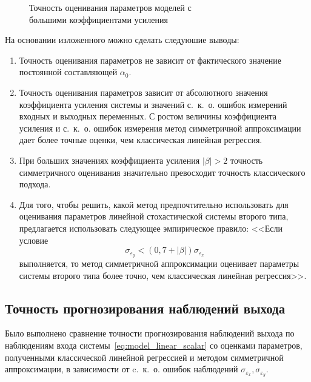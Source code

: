 \begin{figure}[p]
  \vspace{\baselineskip}
  \caption{%
    Точность оценивания параметров моделей с \\
    большими коэффициентами усиления
  }\label{fig:comparison_linear_params_beta-big}
\end{figure}

На основании изложенного можно сделать следуюшие выводы:
\begin{enumerate}
\item Точность оценивания параметров не зависит от фактического значение постоянной
  составляющей \( \alpha_0 \).
\item Точность оценивания параметров зависит от абсолютного значения коэффициента усиления системы и
  значений с.~к.~о. ошибок измерений входных и выходных переменных.
  С ростом величины коэффициента усиления и с.~к.~о. ошибок измерения
  метод симметричной аппроксимации дает более точные оценки,
  чем классическая линейная регрессия.
\item При больших значениях коэффициента усиления \( |\beta| > 2 \)
  точность симметричного оценивания значительно превосходит
  точность классического подхода.
\item Для того, чтобы решить, какой метод предпочтительно использовать для оценивания параметров
  линейной стохастической системы второго типа,
  предлагается использовать следующее эмпирическое правило:
  <<Если условие
  \begin{equation}
    \sigma_{\varepsilon_y} < (0{,}7 + |\beta|) \sigma_{\varepsilon_x}
    \label{eq:rule_linear_param}
  \end{equation}
  выполняется, то метод симметричной аппроксимации оценивает параметры системы
  второго типа более точно, чем классическая линейная регрессия>>.
\end{enumerate}

\newpage
\subsection{Точность прогнозирования наблюдений выхода}

Было выполнено сравнение точности прогнозирования наблюдений выхода по наблюдениям входа
системы~\eqref{eq:model_linear_scalar} со оценками параметров,
полученными классической линейной регрессией и методом симметричной аппроксимации,
в зависимости от c.~к.~о. ошибок наблюдений \( \sigma_{\varepsilon_x}, \sigma_{\varepsilon_y} \).

